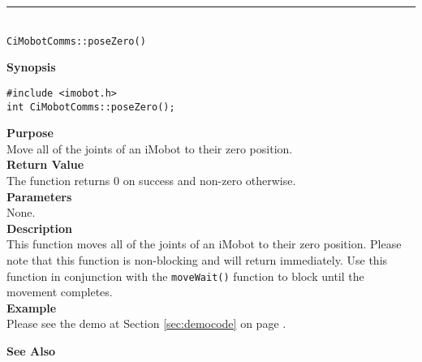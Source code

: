 \noindent
\vspace{5pt}
\rule{4.5in}{0.015in}\\
\noindent
{\LARGE \texttt{CiMobotComms::poseZero()}}\\
{}

\noindent
{\bf Synopsis}\\
\begin{verbatim}
#include <imobot.h>
int CiMobotComms::poseZero();
\end{verbatim}

\noindent
{\bf Purpose}\\
Move all of the joints of an iMobot to their zero position.\\

\noindent
{\bf Return Value}\\
The function returns 0 on success and non-zero otherwise.\\

\noindent
{\bf Parameters}\\
None.\\

\noindent
{\bf Description}\\
This function moves all of the joints of an iMobot to their zero position.
Please note that this function is non-blocking and will return immediately. Use
this function in conjunction with the \texttt{moveWait()} function to block
until the movement completes.\\

\noindent
{\bf Example}\\
Please see the demo at Section \ref{sec:democode} on page \pageref{sec:democode}.\\
\noindent

\noindent
{\bf See Also}\\

